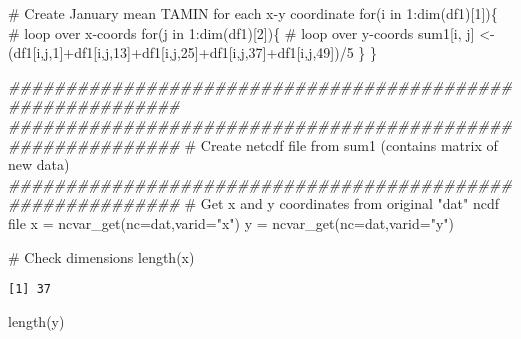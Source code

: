 \documentclass[
  letterpaper,
]{book}
\newenvironment{Shaded}{\begin{snugshade}}{\end{snugshade}}
\newcommand{\AttributeTok}[1]{\textcolor[rgb]{0.40,0.45,0.13}{#1}}
\newcommand{\CommentTok}[1]{\textcolor[rgb]{0.37,0.37,0.37}{#1}}
\newcommand{\ControlFlowTok}[1]{\textcolor[rgb]{0.00,0.23,0.31}{#1}}
\newcommand{\DecValTok}[1]{\textcolor[rgb]{0.68,0.00,0.00}{#1}}
\newcommand{\DocumentationTok}[1]{\textcolor[rgb]{0.37,0.37,0.37}{\textit{#1}}}
\newcommand{\FunctionTok}[1]{\textcolor[rgb]{0.28,0.35,0.67}{#1}}
\newcommand{\NormalTok}[1]{\textcolor[rgb]{0.00,0.23,0.31}{#1}}
\newcommand{\OtherTok}[1]{\textcolor[rgb]{0.00,0.23,0.31}{#1}}
\newcommand{\SpecialCharTok}[1]{\textcolor[rgb]{0.37,0.37,0.37}{#1}}
\newcommand{\StringTok}[1]{\textcolor[rgb]{0.13,0.47,0.30}{#1}}
\begin{document}
\begin{Shaded}
\begin{Highlighting}[]
\CommentTok{\# Create January mean TAMIN for each x{-}y coordinate}
\ControlFlowTok{for}\NormalTok{(i }\ControlFlowTok{in} \DecValTok{1}\SpecialCharTok{:}\FunctionTok{dim}\NormalTok{(df1)[}\DecValTok{1}\NormalTok{])\{ }\CommentTok{\# loop over x{-}coords}
    \ControlFlowTok{for}\NormalTok{(j }\ControlFlowTok{in} \DecValTok{1}\SpecialCharTok{:}\FunctionTok{dim}\NormalTok{(df1)[}\DecValTok{2}\NormalTok{])\{ }\CommentTok{\# loop over y{-}coords}
\NormalTok{        sum1[i, j] }\OtherTok{\textless{}{-}}\NormalTok{ (df1[i,j,}\DecValTok{1}\NormalTok{]}\SpecialCharTok{+}\NormalTok{df1[i,j,}\DecValTok{13}\NormalTok{]}\SpecialCharTok{+}\NormalTok{df1[i,j,}\DecValTok{25}\NormalTok{]}\SpecialCharTok{+}\NormalTok{df1[i,j,}\DecValTok{37}\NormalTok{]}\SpecialCharTok{+}\NormalTok{df1[i,j,}\DecValTok{49}\NormalTok{])}\SpecialCharTok{/}\DecValTok{5}
\NormalTok{    \}}
\NormalTok{\}}

\DocumentationTok{\#\#\#\#\#\#\#\#\#\#\#\#\#\#\#\#\#\#\#\#\#\#\#\#\#\#\#\#\#\#\#\#\#\#\#\#\#\#\#\#\#\#\#\#\#\#\#\#\#\#\#\#\#\#\#\#\#\#\#}
\DocumentationTok{\#\#\#\#\#\#\#\#\#\#\#\#\#\#\#\#\#\#\#\#\#\#\#\#\#\#\#\#\#\#\#\#\#\#\#\#\#\#\#\#\#\#\#\#\#\#\#\#\#\#\#\#\#\#\#\#\#\#\#}
\CommentTok{\# Create netcdf file from sum1 (contains matrix of new data)}
\DocumentationTok{\#\#\#\#\#\#\#\#\#\#\#\#\#\#\#\#\#\#\#\#\#\#\#\#\#\#\#\#\#\#\#\#\#\#\#\#\#\#\#\#\#\#\#\#\#\#\#\#\#\#\#\#\#\#\#\#\#\#\#}
\CommentTok{\# Get x and y coordinates from original "dat" ncdf file}
\NormalTok{x  }\OtherTok{=} \FunctionTok{ncvar\_get}\NormalTok{(}\AttributeTok{nc=}\NormalTok{dat,}\AttributeTok{varid=}\StringTok{"x"}\NormalTok{)   }
\NormalTok{y  }\OtherTok{=} \FunctionTok{ncvar\_get}\NormalTok{(}\AttributeTok{nc=}\NormalTok{dat,}\AttributeTok{varid=}\StringTok{"y"}\NormalTok{)  }

\CommentTok{\# Check dimensions}
\FunctionTok{length}\NormalTok{(x)}
\end{Highlighting}
\end{Shaded}

\begin{verbatim}
[1] 37
\end{verbatim}

\begin{Shaded}
\begin{Highlighting}[]
\FunctionTok{length}\NormalTok{(y)}
\end{Highlighting}
\end{Shaded}
\end{document}

